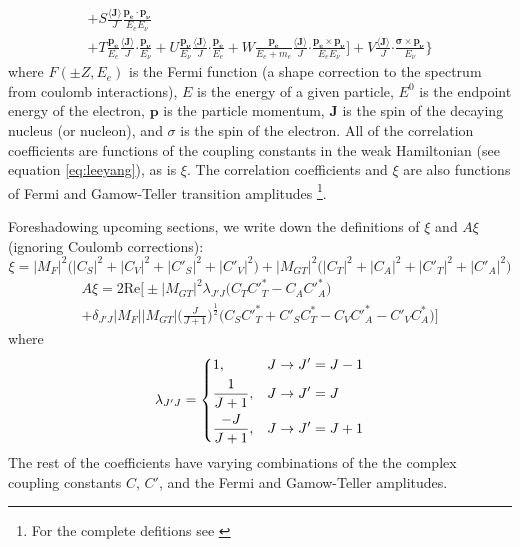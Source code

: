 \begin{multline}
    + S\frac{\langle \boldsymbol{J} \rangle}{J} \frac{\boldsymbol{p_e\cdot p_\nu}}{E_e E_\nu} \\
    + T\frac{\boldsymbol{p_e}}{E_e}\frac{\langle \boldsymbol{J} \rangle}{J} \boldsymbol{\cdot} \frac{\boldsymbol{p_\nu}}{E_\nu}
    + U\frac{\boldsymbol{p_\nu}}{E_\nu}\frac{\langle \boldsymbol{J} \rangle}{J} \boldsymbol{\cdot} \frac{\boldsymbol{p_e}}{E_e}
    + W\frac{\boldsymbol{p_e}}{E_e+m_e}\frac{\langle \boldsymbol{J} \rangle}{J} \boldsymbol{\cdot} \frac{\boldsymbol{p_e \times p_\nu}}{E_e E_\nu}
    \Bigg]
  + V\frac{\langle \boldsymbol{J} \rangle}{J} \boldsymbol{\cdot} \frac{\boldsymbol{\sigma \times p_\nu}}{E_\nu}
  \Bigg\}
  \label{eq:jackson}
\end{multline}
%
where $F(\pm Z, E_e)$ is the Fermi function (a shape correction to the spectrum
from coulomb interactions), $E$ is the energy of a given particle, $E^0$ is the endpoint
energy of the electron, $\boldsymbol{p}$ is the particle momentum, $\boldsymbol{J}$ is the spin of the
decaying nucleus (or nucleon), and $\sigma$ is the spin of the electron. All of the correlation coefficients
are functions of the coupling constants in the weak Hamiltonian (see equation \ref{eq:leeyang}),
as is $\xi$. The correlation coefficients and $\xi$ are also functions of Fermi and Gamow-Teller
transition amplitudes \footnote{For the complete defitions see \cite{jackson1957a,jackson1957b,ebel1957}}.

Foreshadowing upcoming sections, we write down the definitions of $\xi$ and $A\xi$ (ignoring Coulomb
corrections):
%
\begin{equation}
  \xi = |M_F|^2\big(|C_S|^2+|C_V|^2+|C'_S|^2+|C'_V|^2\big)+|M_{GT}|^2\big(|C_T|^2+|C_A|^2+|C'_T|^2+|C'_A|^2\big)
\end{equation}
%
\begin{multline}
  A\xi = 2\mathrm{Re}\bigg[\pm |M_{GT}|^2 \lambda_{J'J}\big(C_TC'^*_T-C_AC'^*_A \big) \\
    + \delta_{J'J}|M_F||M_{GT}|\bigg( \frac{J}{J+1} \bigg)^{\frac{1}{2}}\big(C_SC'^*_T+C'_SC^*_T -C_VC'^*_A-C'_VC^*_A \big) \bigg]
\end{multline}
where
\begin{equation}
\lambda_{J'J} =
\begin{dcases}
  1, & J\rightarrow J'=J-1 \\
  \frac{1}{J+1}, &  J\rightarrow J'=J \\
  \frac{-J}{J+1}, &  J\rightarrow J'=J+1 \\
\end{dcases}
\end{equation}
The rest of the coefficients have varying combinations of the the complex coupling
constants $C$, $C'$, and the Fermi and
Gamow-Teller amplitudes.

